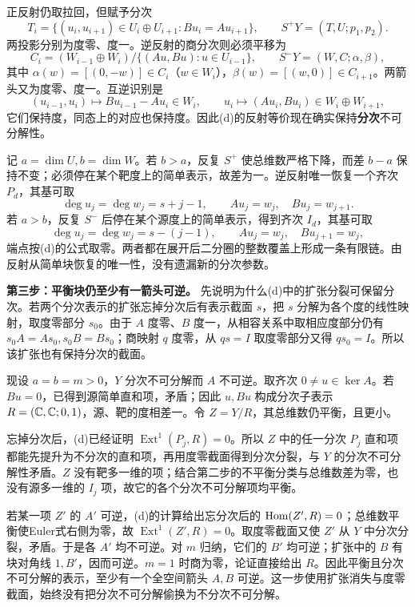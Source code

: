 \begin{solution}
正反射仍取拉回，但赋予分次
\[
 T_i=\{(u_i,u_{i+1})\in U_i\oplus U_{i+1}:Bu_i=Au_{i+1}\},
 \qquad S^+Y=(T,U;p_1,p_2).
\]
两投影分别为度零、度一。逆反射的商分次则必须平移为
\[
 C_i=(W_{i-1}\oplus W_i)/
       \{(Au,Bu):u\in U_{i-1}\},\qquad S^-Y=(W,C;\alpha,\beta),
\]
其中 $\alpha(w)=[(0,-w)]\in C_i$（$w\in W_i$），$\beta(w)=[(w,0)]\in C_{i+1}$。两箭头又为度零、度一。互逆识别是
\[
 (u_{i-1},u_i)\longmapsto Bu_{i-1}-Au_i\in W_i,
 \qquad u_i\longmapsto(Au_i,Bu_i)\in W_i\oplus W_{i+1},
\]
它们保持度，同态上的对应也保持度。因此(d)的反射等价现在确实保持\textbf{分次}不可分解性。

记 $a=\dim U,b=\dim W$。若 $b>a$，反复 $S^+$ 使总维数严格下降，而差 $b-a$ 保持不变；必须停在某个靶度上的简单表示，故差为一。逆反射唯一恢复一个齐次 $P_d$，其基可取
\[
 \deg u_j=\deg w_j=s+j-1,\qquad Au_j=w_j,\quad Bu_j=w_{j+1}.
\]
若 $a>b$，反复 $S^-$ 后停在某个源度上的简单表示，得到齐次 $I_d$，其基可取
\[
 \deg u_j=\deg w_j=s-(j-1),\qquad Au_j=w_j,\quad Bu_{j+1}=w_j,
\]
端点按(d)的公式取零。两者都在展开后二分圈的整数覆盖上形成一条有限链。由反射从简单块恢复的唯一性，没有遗漏新的分次参数。

\textbf{第三步：平衡块仍至少有一箭头可逆。}
先说明为什么(d)中的扩张分裂可保留分次。若两个分次表示的扩张忘掉分次后有表示截面 $s$，把 $s$ 分解为各个度的线性映射，取度零部分 $s_0$。由于 $A$ 度零、$B$ 度一，从相容关系中取相应度部分仍有 $s_0A=As_0,s_0B=Bs_0$；商映射 $q$ 度零，从 $qs=I$ 取度零部分又得 $qs_0=I$。所以该扩张也有保持分次的截面。

现设 $a=b=m>0$，$Y$ 分次不可分解而 $A$ 不可逆。取齐次 $0\ne u\in\ker A$。若 $Bu=0$，已得到源简单直和项，矛盾；因此 $u,Bu$ 构成分次子表示 $R=(\mathbb C,\mathbb C;0,1)$，源、靶的度相差一。令 $Z=Y/R$，其总维数仍平衡，且更小。

忘掉分次后，(d)已经证明 $\operatorname{Ext}^1(P_j,R)=0$。所以 $Z$ 中的任一分次 $P_j$ 直和项都能先提升为不分次的直和项，再用度零截面得到分次分裂，与 $Y$ 的分次不可分解性矛盾。$Z$ 没有靶多一维的项；结合第二步的不平衡分类与总维数差为零，也没有源多一维的 $I_j$ 项，故它的各个分次不可分解项均平衡。

若某一项 $Z'$ 的 $A'$ 可逆，(d)的计算给出忘分次后的 $\operatorname{Hom}(Z',R)=0$；总维数平衡使Euler式右侧为零，故 $\operatorname{Ext}^1(Z',R)=0$。取度零截面又使 $Z'$ 从 $Y$ 中分次分裂，矛盾。于是各 $A'$ 均不可逆。对 $m$ 归纳，它们的 $B'$ 均可逆；扩张中的 $B$ 有块对角线 $1,B'$，因而可逆。$m=1$ 时商为零，论证直接给出 $R$。因此平衡且分次不可分解的表示，至少有一个全空间箭头 $A,B$ 可逆。这一步使用扩张消失与度零截面，始终没有把分次不可分解偷换为不分次不可分解。


\end{solution}

